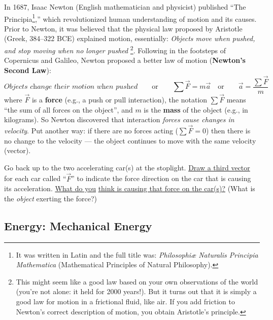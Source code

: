 In 1687, Isaac Newton (English mathematician and physicist) published ``The Principia\footnote{It was written in Latin and the full title was: {\em  Philosophiæ Naturalis Principia Mathematica} (Mathematical Principles of Natural Philosophy).},'' which revolutionized human understanding of motion and its causes.  Prior to Newton, it was believed that the physical law proposed by Aristotle (Greek, 384--322 BCE) explained motion, essentially: {\em Objects move when pushed,  and stop moving when no longer pushed} \footnote{This might seem like a good law based on your own observations of the world (you're not alone: it held for 2000 years!). But it turns out that it is simply a good law for motion in a frictional fluid, like air.  If you add friction to Newton's correct description of motion, you obtain Aristotle's principle.}.  Following in the footsteps of Copernicus and Galileo, Newton proposed a better law of motion ({\bf Newton's Second Law}):
	\begin{equation*}
	\textit{Objects change their motion when pushed} \quad\quad \text{or} \quad\quad \sum \vec{F} = m \vec{a} \quad \text{or} \quad\quad \vec{a} = \frac{\sum \vec{F}}{m}
	\end{equation*}
where $\vec{F}$ is a {\bf force} (e.g., a push or pull interaction), the notation $\sum \vec{F}$ means ``the sum of all forces on the object'', and $m$ is the {\bf mass} of the object (e.g., in kilograms).  So Newton discovered that interaction {\em forces cause changes in velocity}.  Put another way: if there are no forces acting ($\sum \vec{F} = 0$) then there is no change to the velocity --- the object continues to move with the same velocity (vector).

Go back up to the two accelerating car(s) at the stoplight.  \underline{Draw a third vector} for each car called ``$\vec{F}$'' to indicate the force direction on the car that is causing its acceleration.  \underline{What do you} \underline{think is causing that force on the car(s)?}  (What is the {\em object} exerting the force?)

\vspace{0.5cm}

\subsection{Energy: Mechanical Energy}

